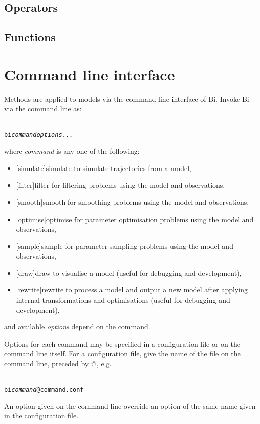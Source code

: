 \subsection{Operators\label{Operators}}

\subsection{Functions\label{Functions}}

\section{Command line interface\label{Command_line_interface}}

Methods are applied to models via the command line interface of Bi. Invoke Bi
via the command line as:
\begin{alltt}{\sf
    bi \textit{command} \textit{options} ...
}\end{alltt}
where \textsf{\textit{command}} is any one of the following:
\begin{itemize}
\item \textsf{\hyperref[hyper][simulate]{simulate}} to simulate trajectories
  from a model,
\item \textsf{\hyperref[hyper][filter]{filter}} for filtering problems using the
  model and observations,
\item \textsf{\hyperref[hyper][smooth]{smooth}} for smoothing problems using the
  model and observations,
\item \textsf{\hyperref[hyper][optimise]{optimise}} for parameter optimisation
  problems using the model and observations,
\item \textsf{\hyperref[hyper][sample]{sample}} for parameter sampling
  problems using the model and observations,
\item \textsf{\hyperref[hyper][draw]{draw}} to visualise a model (useful for
  debugging and development),
\item \textsf{\hyperref[hyper][rewrite]{rewrite}} to process a model and
  output a new model after applying internal transformations and optimisations
  (useful for debugging and development),
\end{itemize}
and available \textsf{\textit{options}} depend on the command.

Options for each command may be specified in a configuration file or on the command line itself. For a configuration file, give the name
of the file on the command line, preceded by \textsf{@}, e.g.
\begin{alltt}{\sf
    bi \textit{command} @command.conf
}\end{alltt}
An option given on the command line override an option of the same name given
in the configuration file.


